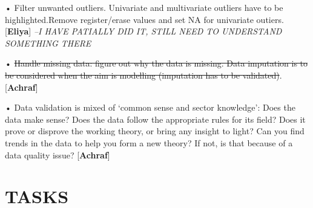 \documentclass[
]{article}
\begin{document}
• Filter unwanted outliers. Univariate and multivariate outliers have to
be highlighted.Remove register/erase values and set NA for univariate
outiers. {[}\textbf{Eliya}{]} \emph{--I HAVE PATIALLY DID IT, STILL NEED
TO UNDERSTAND SOMETHING THERE}

• \sout{Handle missing data: figure out why the data is missing. Data
imputation is to be considered when the aim is modelling (imputation has
to be validated)}. {[}\textbf{Achraf}{]}

• Data validation is mixed of `common sense and sector knowledge': Does
the data make sense? Does the data follow the appropriate rules for its
field? Does it prove or disprove the working theory, or bring any
insight to light? Can you find trends in the data to help you form a new
theory? If not, is that because of a data quality issue?
{[}\textbf{Achraf}{]}

\hypertarget{tasks}{%
\section{TASKS}\label{tasks}}
\end{document}
